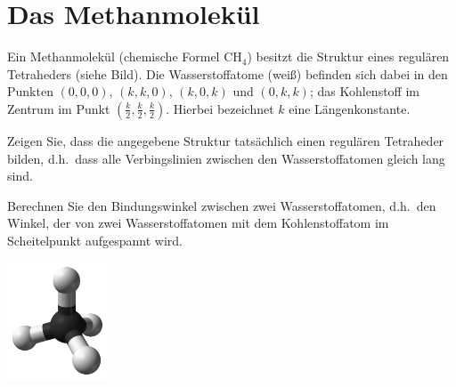 \documentclass{scrartcl}
\begin{document}
\begin{center}
\end{center}


\section{Das Methanmolekül}
Ein Methanmolekül (chemische Formel $\mathrm{CH}_4$) besitzt die Struktur eines regulären Tetraheders (siehe Bild).
Die Wasserstoffatome (weiß) befinden sich dabei in den Punkten $(0,0,0)$, $(k,k,0)$, $(k,0,k)$ und $(0,k,k)$; das Kohlenstoff im Zentrum im Punkt $(\frac{k}{2},\frac{k}{2},\frac{k}{2})$.
Hierbei bezeichnet $k$ eine Längenkonstante.
\begin{subex}
  \item Zeigen Sie, dass die angegebene Struktur tatsächlich einen regulären Tetraheder bilden, d.h.\ dass alle Verbingslinien zwischen den Wasserstoffatomen gleich lang sind.
  \item Berechnen Sie den Bindungswinkel zwischen zwei Wasserstoffatomen, d.h.\ den Winkel, der von zwei Wasserstoffatomen mit dem Kohlenstoffatom im Scheitelpunkt aufgespannt wird.
\end{subex}

\begin{center}
  \includegraphics[width=3cm]{img/methan.png}
\end{center}


 
\end{document}
